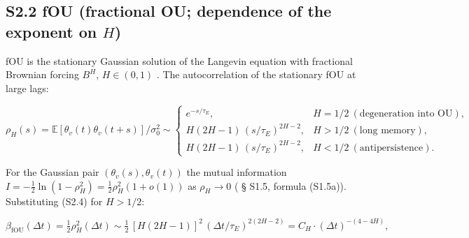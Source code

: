 \documentclass[12pt]{iopart}
\providecommand{\texorpdfstring}[2]{#1}
\begin{document}
\subsection{\texorpdfstring{S2.2 fOU (fractional OU; dependence of the exponent on \(H\))}{S2.2 fOU (fractional OU; dependence of the exponent on H)}}\label{s2.2-fou-fractional-ou-dependence-of-the-exponent-on-h}



fOU is the stationary Gaussian solution of the Langevin equation with fractional Brownian forcing \(B^H\), \(H \in (0,1)\) \cite{Mandelbrot1968,Cheridito2003}. The autocorrelation of the stationary fOU at large lags:



\begin{equation}\rho_H(s) = \mathbb{E}[\theta_v(t)\theta_v(t+s)]/\sigma_0^2 \sim \begin{cases} e^{-s/\tau_E}, & H = 1/2 \ (\text{degeneration into OU}),\\[2pt] H(2H-1)\,(s/\tau_E)^{2H-2}, & H > 1/2 \ (\text{long memory}),\\[2pt] H(2H-1)\,(s/\tau_E)^{2H-2}, & H < 1/2 \ (\text{antipersistence}).\end{cases} \tag{S2.4}\end{equation}



For the Gaussian pair \((\theta_v(s),\theta_v(t))\) the mutual information \(I = -\tfrac12\ln(1-\rho_H^2) = \tfrac12\rho_H^2(1+o(1))\) as \(\rho_H \to 0\) (\cite{Andriishin2026b} § S1.5, formula (S1.5a)). Substituting (S2.4) for \(H > 1/2\):



\begin{equation}\beta_{\text{fOU}}(\Delta t) = \tfrac12\rho_H^2(\Delta t) \sim \tfrac12\,[H(2H-1)]^2\,(\Delta t/\tau_E)^{2(2H-2)} = C_H\cdot(\Delta t)^{-(4-4H)}, \tag{S2.5}\end{equation}
\end{document}
